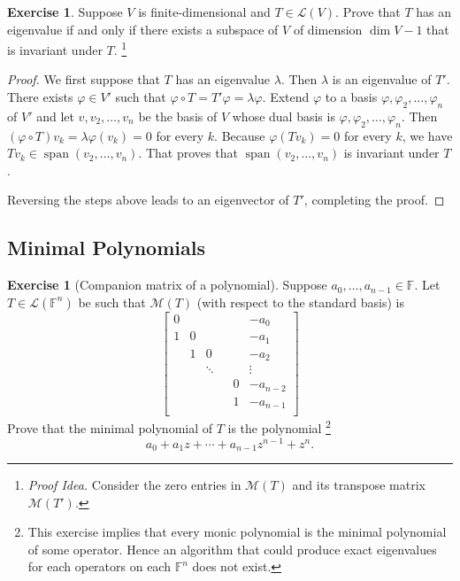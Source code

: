 \documentclass[colorlinks]{tufte-handout}
\theoremstyle{plain} %
\newtheorem{prop}[thm]{Proposition}
\theoremstyle{definition}
\newtheorem{exer}[thm]{Exercise}
\theoremstyle{remark}
\def\idea{\textit{\color[rgb]{0,0,.55}Proof Idea. }}
\renewcommand{\phi}{\varphi}
\newcommand{\F}{\mathbb{F}}
\renewcommand{\L}{\mathcal{L}}
\newcommand{\M}{\mathcal{M}}
\renewcommand{\P}{\mathcal{P}}
\DeclareMathOperator{\spn}{span}
\begin{document}
\begin{exer}
	Suppose $V$ is finite-dimensional and $T\in\L(V)$. Prove that $T$ has an eigenvalue if and only if there exists a subspace of $V$ of dimension $\dim V-1$ that is invariant under $T$.%
	\footnote{\idea Consider the zero entries in $\M(T)$ and its transpose matrix $\M(T')$.}
\end{exer}
\begin{proof}
	We first suppose that $T$ has an eigenvalue $\lambda$. Then $\lambda$ is an eigenvalue of $T'$. There exists $\phi\in V'$ such that $\phi\circ T=T'\phi=\lambda\phi$. Extend $\phi$ to a basis $\phi,\phi_2,\dots,\phi_n$ of $V'$ and let $v,v_2,\dots,v_n$ be the basis of $V$ whose dual basis is $\phi,\phi_2,\dots,\phi_n$. Then $(\phi\circ T)v_k=\lambda\phi(v_k)=0$ for every $k$. Because $\phi(T v_k)=0$ for every $k$, we have $Tv_k\in\spn(v_2,\dots,v_n)$. That proves that $\spn(v_2,\dots,v_n)$ is invariant under $T$.
	
	Reversing the steps above leads to an eigenvector of $T'$, completing the proof.
\end{proof}


\subsection{Minimal Polynomials}
\begin{exer}[Companion matrix of a polynomial]
	Suppose $a_0,\dots,a_{n-1}\in\F$. Let $T\in\L(\F^n)$ be such that $\M(T)$ (with respect to the standard basis) is
	\[\begin{bmatrix}
		0&&&&&-a_0\\
		1&0&&&&-a_1\\
		&1&0&&&-a_2\\
		&&\ddots&&&\vdots\\
		&&&&0&-a_{n-2}\\
		&&&&1&-a_{n-1}\\
	\end{bmatrix}\]
	Prove that the minimal polynomial of $T$ is the polynomial%
	\footnote{This exercise implies that every monic polynomial is the minimal polynomial of some operator. Hence an algorithm that could produce exact eigenvalues for each operators on each $\F^n$ does not exist.}
	\[a_0+a_1z+\cdots+a_{n-1}z^{n-1}+z^n.\]
\end{exer}

\end{document}
